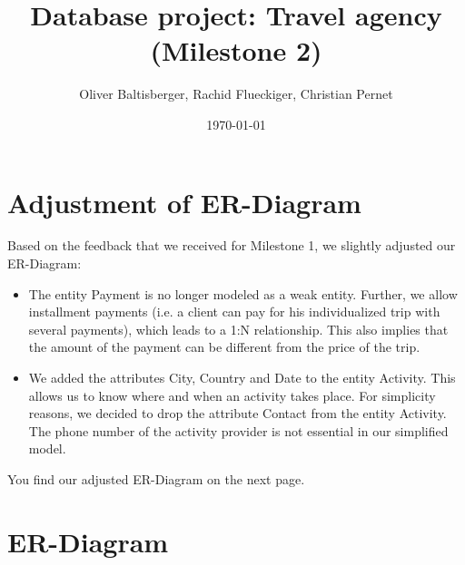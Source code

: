 \documentclass{article}
\title{Database project: Travel agency \\ (Milestone 2)}
\author{Oliver Baltisberger, Rachid Flueckiger, Christian Pernet}
\date{\today}
\begin{document}
	\maketitle
	
	\section*{Adjustment of ER-Diagram}
	Based on the feedback that we received for Milestone 1, we slightly adjusted our ER-Diagram:
	\begin{itemize}
		\item The entity Payment is no longer modeled as a weak entity. Further, we allow installment payments (i.e. a client can pay for his individualized trip with several payments), which leads to a 1:N relationship.
		This also implies that the amount of the payment can be different from the price of the trip.
		\item We added the attributes City, Country and Date to the entity Activity. This allows us to know where and when an activity takes place.
		For simplicity reasons, we decided to drop the attribute Contact from the entity Activity. The phone number of the activity provider is not essential in our simplified model.
	\end{itemize}
	
You find our adjusted ER-Diagram on the next page.
	\newpage
	
	\section*{ER-Diagram}
	
\end{document}
